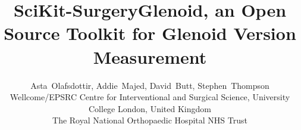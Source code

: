 \documentclass[a4paper, lmargin=1.925cm, rmargin=1.925cm,tmargin=2.54cm,bmargin=4.94cm]{spie}
\begin{document}
%
%
\pagestyle{plain}
%
%
\title{SciKit-SurgeryGlenoid, an Open Source Toolkit for Glenoid Version Measurement}
%
\author{Asta~Olafsdottir, Addie~Majed, David~Butt, Stephen~Thompson
\skiplinehalf
{}Wellcome/EPSRC Centre for Interventional and Surgical Science, University College London, United Kingdom \\
The Royal National Orthopaedic Hospital NHS Trust\\
}

\maketitle              %

\begin{abstract}

\end{abstract}






%



\end{document}
